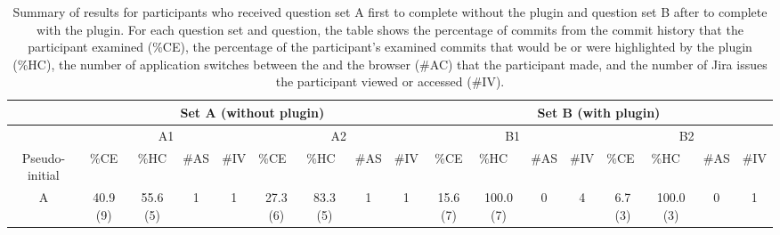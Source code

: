 \begin{landscape}
  \begin{table}
    \footnotesize
    \caption{
      Summary of results for participants who received question set A first to complete without the plugin and question set B after to complete with the plugin.
      For each question set and question, the table shows the percentage of commits from the commit history that the participant examined (\%CE), 
      the percentage of the participant's examined commits that would be or were highlighted by the plugin (\%HC),
      the number of application switches between the  and the browser (\#AC) that the participant made,
      and the number of Jira issues the participant viewed or accessed (\#IV).
    }
    \centering
    \begin{tabular}{@{}ccccccccccccccccc@{}}
      \toprule
      \multicolumn{1}{l}{}                & \multicolumn{8}{c}{Set A (without plugin)}                                                                                                                            & \multicolumn{8}{c}{Set B (with plugin)}                                                                                                                                                                 \\ \midrule
      \multicolumn{1}{c|}{}               & \multicolumn{4}{c|}{A1}                                  & \multicolumn{4}{c|}{A2}                                                                                    & \multicolumn{4}{c|}{B1}                                                                     & \multicolumn{4}{c}{B2}                                                                                    \\ \midrule
      \multicolumn{1}{c|}{Pseudo-initial} & \%CE      & \%HC      & \#AS & \multicolumn{1}{l|}{\#IV} & \multicolumn{1}{l}{\%CE} & \multicolumn{1}{l}{\%HC} & \multicolumn{1}{l}{\#AS} & \multicolumn{1}{l|}{\#IV} & \%CE      & \multicolumn{1}{l}{\%HC} & \multicolumn{1}{l}{\#AS} & \multicolumn{1}{l|}{\#IV} & \multicolumn{1}{l}{\%CE} & \multicolumn{1}{l}{\%HC} & \multicolumn{1}{l}{\#AS} & \multicolumn{1}{l}{\#IV} \\ \midrule
      \multicolumn{1}{c|}{A}              & 40.9 (9)  & 55.6 (5)  & 1    & \multicolumn{1}{c|}{1}    & 27.3 (6)                 & 83.3 (5)                 & 1                        & \multicolumn{1}{c|}{1}    & 15.6 (7)  & 100.0 (7)                & 0                        & \multicolumn{1}{c|}{4}    & 6.7 (3)                  & 100.0 (3)                & 0                        & 1                        \\

\end{tabular}
\end{table}
\end{landscape}
